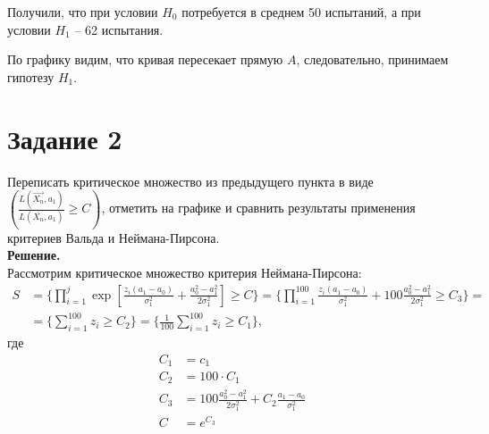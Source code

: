 \documentclass[14pt,a4paper]{scrartcl}
\begin{document}
\newpage 

Получили, что при условии $H_0$ потребуется в среднем 50 испытаний, а при условии $H_1$ -- 62 испытания.

\begin{figure}[h]
	\label{ris:vald1}
\end{figure}

По графику видим, что кривая пересекает прямую $A$, следовательно, принимаем гипотезу $H_1$.

\newpage

\section*{Задание 2}
Переписать критическое множество из предыдущего пункта в виде $\left(\frac{L\left(\overrightarrow{X_{n}}, a_{1}\right)}{L\left(\overline{X_{n}}, a_{1}\right)} \geqslant C\right)$, отметить на графике и сравнить результаты применения критериев Вальда и Неймана-Пирсона.\\
\textbf{Решение.}\\
Рассмотрим критическое множество критерия Неймана-Пирсона:
\begin{align*}
	S &= \{ \prod\limits_{i=1}^j \exp{\left[\frac{z_{i}(a_1-a_0)}{\sigma_1^{2}}+\frac{a_0^{2}-a_1^{2}}{2 \sigma_1^{2}}\right]} \geqslant C\} = \{ \prod\limits_{i=1}^{100} \frac{z_i(a_1-a_0)}{\sigma_1^2} + 100 \frac{a_0^2-a_1^2}{2\sigma_1^2} \geqslant C_3 \} =\\
	&= \{ \sum\limits_{i=1}^{100} z_i \geqslant C_2 \} = \{ \frac{1}{100}\sum\limits_{i=1}^{100} z_i \geqslant C_1 \},
\end{align*}
где
\begin{align*}
	C_1 &= c_1\\
	C_2 &= 100 \cdot C_1\\
	C_3 &= 100 \frac{a_0^2-a_1^2}{2\sigma_1^2} + C_2 \frac{a_1-a_0}{\sigma_1^2}\\
	C &= e^{C_3}
\end{align*}
\end{document}
